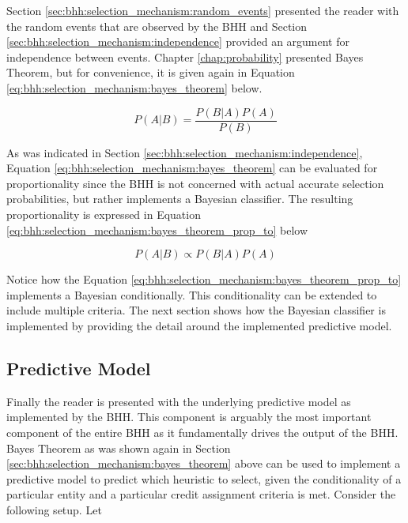 Section \ref{sec:bhh:selection_mechanism:random_events} presented the reader with the random events that are observed by the \ac{BHH} and Section \ref{sec:bhh:selection_mechanism:independence} provided an argument for independence between events. Chapter \ref{chap:probability} presented Bayes Theorem, but for convenience, it is given again in Equation \ref{eq:bhh:selection_mechanism:bayes_theorem} below.

\begin{equation}
      \label{eq:bhh:selection_mechanism:bayes_theorem}
      P(A \vert B) = \frac{P(B \vert A)P(A)}{P(B)}
\end{equation}

As was indicated in Section \ref{sec:bhh:selection_mechanism:independence}, Equation \ref{eq:bhh:selection_mechanism:bayes_theorem} can be evaluated for proportionality since the \ac{BHH} is not concerned with actual accurate selection probabilities, but rather implements a Bayesian classifier. The resulting proportionality is expressed in Equation \ref{eq:bhh:selection_mechanism:bayes_theorem_prop_to} below

\begin{equation}
      \label{eq:bhh:selection_mechanism:bayes_theorem_prop_to}
      P(A \vert B) \propto P(B \vert A)P(A)
\end{equation}

Notice how the Equation \ref{eq:bhh:selection_mechanism:bayes_theorem_prop_to} implements a Bayesian conditionally. This conditionality can be extended to include multiple criteria. The next section shows how the Bayesian classifier is implemented by providing the detail around the implemented predictive model.


\subsection{Predictive Model}
\label{sec:bhh:selection_mechanism:predictive_model}

Finally the reader is presented with the underlying predictive model as implemented by the \ac{BHH}. This component is arguably the most important component of the entire \ac{BHH} as it fundamentally drives the output of the \ac{BHH}. Bayes Theorem as was shown again in Section \ref{sec:bhh:selection_mechanism:bayes_theorem} above can be used to implement a predictive model to predict which heuristic to select, given the conditionality of a particular entity and a particular credit assignment criteria is met. Consider the following setup. Let

